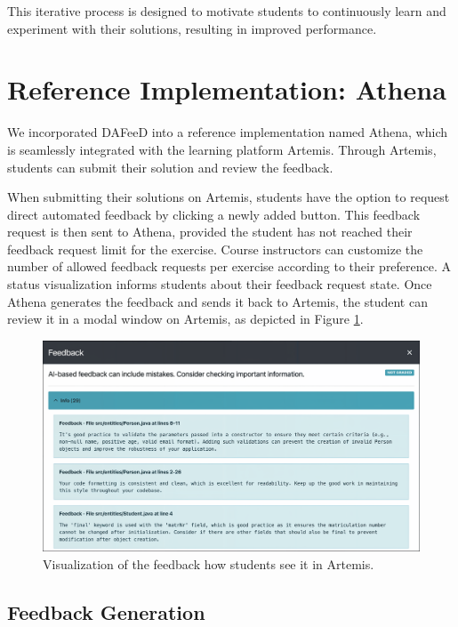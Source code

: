 \documentclass[manuscript,screen,review]{acmart}
\begin{document}
This iterative process is designed to motivate students to continuously learn and experiment with their solutions, resulting in improved performance.


\section{Reference Implementation: Athena} %
\label{sec:reference-implementation}

We incorporated DAFeeD into a reference implementation named Athena, which is seamlessly integrated with the learning platform Artemis. 
Through Artemis, students can submit their solution and review the feedback.

When submitting their solutions on Artemis, students have the option to request direct automated feedback by clicking a newly added button.
This feedback request is then sent to Athena, provided the student has not reached their feedback request limit for the exercise.
Course instructors can customize the number of allowed feedback requests per exercise according to their preference.
A status visualization informs students about their feedback request state.
Once Athena generates the feedback and sends it back to Artemis, the student can review it in a modal window on Artemis, as depicted in Figure \ref{fig:Artemis-feedback-visualization}.

\begin{figure}[htbp]
  \centering
  \includegraphics[width=0.75\linewidth]{figures/artemis-feedback-alt_light_clarity-upscaler_anonymized.png}
  \caption{Visualization of the feedback how students see it in Artemis.}
  \label{fig:Artemis-feedback-visualization}
\end{figure}


\subsection{Feedback Generation}
\end{document}
